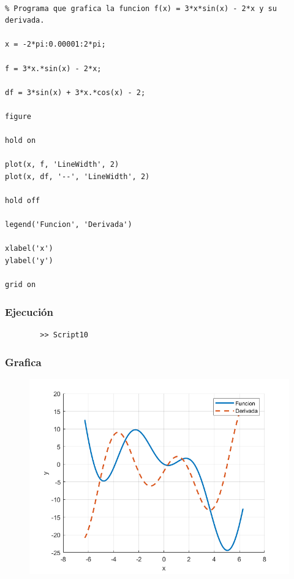 \documentclass{article}
\begin{document}
	\begin{lstlisting}
		
% Programa que grafica la funcion f(x) = 3*x*sin(x) - 2*x y su derivada.

x = -2*pi:0.00001:2*pi;

f = 3*x.*sin(x) - 2*x;

df = 3*sin(x) + 3*x.*cos(x) - 2;

figure

hold on

plot(x, f, 'LineWidth', 2)
plot(x, df, '--', 'LineWidth', 2)

hold off

legend('Funcion', 'Derivada')

xlabel('x')
ylabel('y')

grid on

	\end{lstlisting}
	
	\subsubsection{Ejecución}
	
	\begin{lstlisting}
		>> Script10
	\end{lstlisting}
	
	\newpage
	
	\subsubsection{Grafica}
	
	\begin{figure}[h]
		\centering
		\includegraphics[width=\textwidth]{grafica10.png}
	\end{figure}
	
\end{document}
